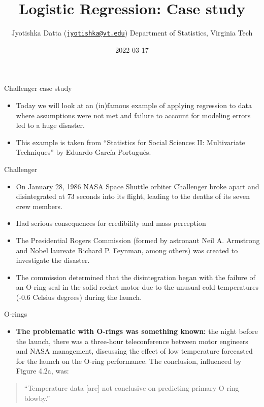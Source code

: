 \documentclass[
  ignorenonframetext,
]{beamer}
\title{Logistic Regression: Case study}
\author{Jyotishka Datta
(\href{mailto:jyotishka@vt.edu}{\nolinkurl{jyotishka@vt.edu}})
Department of Statistics, Virginia Tech}
\date{2022-03-17}
\providecommand{\tightlist}{%
  \setlength{\itemsep}{0pt}\setlength{\parskip}{0pt}}
\begin{document}
\frame{\titlepage}

\begin{frame}{Challenger case study}
\protect\hypertarget{challenger-case-study}{}
\begin{itemize}
\item
  Today we will look at an (in)famous example of applying regression to
  data where assumptions were not met and failure to account for
  modeling errors led to a huge disaster.
\item
  This example is taken from ``Statistics for Social Sciences II:
  Multivariate Techniques'' by Eduardo García Portugués.
\end{itemize}
\end{frame}

\begin{frame}{Challenger}
\protect\hypertarget{challenger}{}
\begin{itemize}
\item
  On January 28, 1986 NASA Space Shuttle orbiter Challenger broke apart
  and disintegrated at 73 seconds into its flight, leading to the deaths
  of its seven crew members.
\item
  Had serious consequences for credibility and mass perception
\item
  The Presidential Rogers Commission (formed by astronaut Neil A.
  Armstrong and Nobel laureate Richard P. Feynman, among others) was
  created to investigate the disaster.
\item
  The commission determined that the disintegration began with the
  failure of an O-ring seal in the solid rocket motor due to the unusual
  cold temperatures (-0.6 Celsius degrees) during the launch.
\end{itemize}
\end{frame}

\begin{frame}{O-rings}
\protect\hypertarget{o-rings}{}
\begin{itemize}
\tightlist
\item
  \textbf{The problematic with O-rings was something known:} the night
  before the launch, there was a three-hour teleconference between motor
  engineers and NASA management, discussing the effect of low
  temperature forecasted for the launch on the O-ring performance. The
  conclusion, influenced by Figure 4.2a, was:
\end{itemize}

\begin{quote}
``Temperature data {[}are{]} not conclusive on predicting primary O-ring
blowby.''
\end{quote}
\end{frame}
\end{document}
